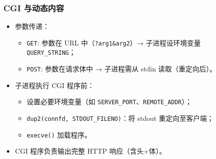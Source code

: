 \subsubsection{CGI 与动态内容}
\begin{itemize}[leftmargin=*,noitemsep]
    \item 参数传递：
          \begin{itemize}
              \item \texttt{GET}: 参数在 URL 中（\texttt{?arg1\&arg2}）→ 子进程设环境变量 \texttt{QUERY\_STRING}；
              \item \texttt{POST}: 参数在请求体中 → 子进程需从 stdin 读取（重定向后）。
          \end{itemize}
    \item 子进程执行 CGI 程序前：
          \begin{itemize}
              \item 设置必要环境变量（如 \texttt{SERVER\_PORT}、\texttt{REMOTE\_ADDR}）；
              \item \texttt{dup2(connfd, STDOUT\_FILENO)}：将 stdout 重定向至客户端；
              \item \texttt{execve()} 加载程序。
          \end{itemize}
    \item CGI 程序负责输出完整 HTTP 响应（含头+体）。
\end{itemize}

\newpage